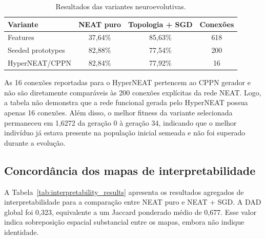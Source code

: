 \begin{table}[ht]
\centering
\caption{Resultados das variantes neuroevolutivas.}
\label{tab:neat_variants}
\begin{tabular}{lccc}
\toprule
\textbf{Variante} & \textbf{NEAT puro} & \textbf{Topologia + SGD} & \textbf{Conex\~oes} \\
\midrule
Features & 37,64\% & 85,63\% & 618 \\
Seeded prototypes & 82,88\% & 77,54\% & 200 \\
HyperNEAT/CPPN & 82,84\% & 77,92\% & 16 \\
\bottomrule
\end{tabular}
\end{table}

As 16 conex\~oes reportadas para o HyperNEAT pertencem ao CPPN gerador e n\~ao
s\~ao diretamente compar\'aveis \`as 200 conex\~oes expl\'icitas da rede NEAT. Logo,
a tabela n\~ao demonstra que a rede funcional gerada pelo HyperNEAT possua apenas
16 conex\~oes. Al\'em disso, o melhor fitness da variante selecionada permaneceu
em 1,6272 da gera\c{c}\~ao 0 \`a gera\c{c}\~ao 34, indicando que o melhor indiv\'iduo j\'a
estava presente na popula\c{c}\~ao inicial semeada e n\~ao foi superado durante a
evolu\c{c}\~ao.

\subsection{Concord\^ancia dos mapas de interpretabilidade}

A Tabela~\ref{tab:interpretability_results} apresenta os resultados agregados
de interpretabilidade para a compara\c{c}\~ao entre NEAT puro e NEAT + SGD. A DAD
global foi 0,323, equivalente a um Jaccard ponderado m\'edio de 0,677. Esse valor
indica sobreposi\c{c}\~ao espacial substancial entre os mapas, embora n\~ao indique
identidade.

